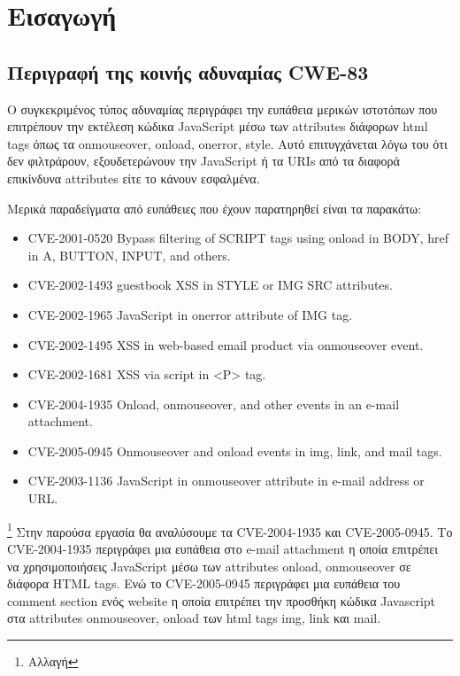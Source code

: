 %
%
\setcounter{chapter}{1}
\section{Εισαγωγή}
\subsection{Περιγραφή της κοινής αδυναμίας CWE-83}
\noindent
Ο συγκεκριμένος τύπος αδυναμίας περιγράφει την ευπάθεια μερικών ιστοτόπων που επιτρέπουν την εκτέλεση κώδικα JavaScript μέσω των attributes διάφορων html tags όπως τα onmouseover, onload,  onerror, style. Αυτό επιτυγχάνεται λόγω του ότι δεν φιλτράρουν, εξουδετερώνουν την JavaScript ή τα URIs από τα διαφορά επικίνδυνα attributes είτε το κάνουν εσφαλμένα.

\noindent
Μερικά παραδείγματα από ευπάθειες που έχουν παρατηρηθεί είναι τα παρακάτω:

\begin{itemize}
	\item CVE-2001-0520 Bypass filtering of SCRIPT tags using onload in BODY, href in A, BUTTON, INPUT, and others.
	\item CVE-2002-1493 guestbook XSS in STYLE or IMG SRC attributes. 
	\item CVE-2002-1965 JavaScript in onerror attribute of IMG tag. 
	\item CVE-2002-1495 XSS in web-based email product via onmouseover event. 
	\item CVE-2002-1681 XSS via script in <P> tag. 
	\item CVE-2004-1935 Onload, onmouseover, and other events in an e-mail attachment. 
	\item CVE-2005-0945 Onmouseover and onload events in img, link, and mail tags. 
	\item CVE-2003-1136 JavaScript in onmouseover attribute in e-mail address or URL. 
	
\end{itemize}


\noindent
\footnote{Αλλαγή} Στην παρούσα εργασία θα αναλύσουμε τα CVE-2004-1935 και CVE-2005-0945. 
Το CVE-2004-1935 περιγράφει μια ευπάθεια στο e-mail attachment η οποία επιτρέπει να χρησιμοποιήσεις JavaScript μέσω των attributes onload, onmouseover σε διάφορα HTML tags. Ενώ το  CVE-2005-0945 περιγράφει μια ευπάθεια του comment section ενός website η οποία επιτρέπει την προσθήκη κώδικα Javascript στα attributes onmouseover, onload των html tags img, link και mail.